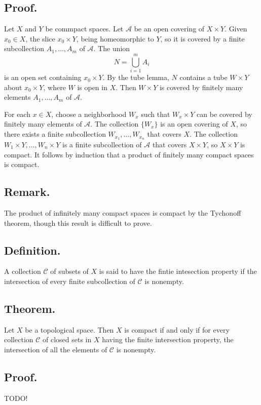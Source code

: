 \documentclass[titlepage]{article}
\begin{document}
\subsection{Proof.} Let $X$ and $Y$ be commpact spaces. Let $\mathcal{A}$ be an open covering of $X \times Y$. Given $x_{0} \in X$, the slice $x_{0} \times Y$, being homeomorphic to $Y$, so it is covered by a finite subcollection $A_{1}, \ldots, A_{m}$ of $\mathcal{A}$. The union 
$$N = \bigcup_{i=1}^{m} A_{i}$$
is an open set containing $x_{0} \times Y$. By the tube lemma, $N$ contains a tube $W \times Y$ about $x_{0} \times Y$, where $W$ is open in $X$. Then $W \times Y$ is covered by finitely many elements $A_{1}, \ldots, A_{m}$ of $\mathcal{A}$.

For each $x \in X$, choose a neighborhood $W_{x}$ such that $W_{x} \times Y$ can be covered by finitely many elements of $\mathcal{A}$. The collection $\{W_{x}\}$ is an open covering of $X$, so there exists a finite subcollection $W_{x_{1}}, \ldots, W_{x_{n}}$ that covers $X$. The collection $W_{1} \times Y, \ldots, W_{n} \times Y$ is a finite subcollection of $\mathcal{A}$ that covers $X \times Y$, so $X \times Y$ is compact. It follows by induction that a product of finitely many compact spaces is compact.

\subsection{Remark.} The product of infinitely many compact spaces is compact by the Tychonoff theorem, though this result is difficult to prove.

\subsection{Definition.} A collection $\mathcal{C}$ of subsets of $X$ is said to have the fintie intesection property if the intersection of every finite subcollection of $\mathcal{C}$ is nonempty.

\subsection{Theorem.} Let $X$ be a topological space. Then $X$ is compact if and only if for every collection $\mathcal{C}$ of closed sets in $X$ having the finite intersection property, the intersection of all the elements of $\mathcal{C}$ is nonempty.

\subsection{Proof.} TODO!
\end{document}
